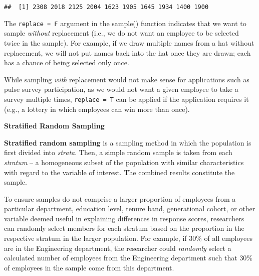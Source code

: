 \documentclass[
]{book}
\newenvironment{Shaded}{\begin{snugshade}}{\end{snugshade}}
\newcommand{\AttributeTok}[1]{\textcolor[rgb]{0.77,0.63,0.00}{#1}}
\newcommand{\CommentTok}[1]{\textcolor[rgb]{0.56,0.35,0.01}{\textit{#1}}}
\newcommand{\DecValTok}[1]{\textcolor[rgb]{0.00,0.00,0.81}{#1}}
\newcommand{\FunctionTok}[1]{\textcolor[rgb]{0.00,0.00,0.00}{#1}}
\newcommand{\NormalTok}[1]{#1}
\newcommand{\OtherTok}[1]{\textcolor[rgb]{0.56,0.35,0.01}{#1}}
\newcommand{\SpecialCharTok}[1]{\textcolor[rgb]{0.00,0.00,0.00}{#1}}
\newcommand{\StringTok}[1]{\textcolor[rgb]{0.31,0.60,0.02}{#1}}
\begin{document}
\begin{Shaded}
\end{Shaded}

\begin{verbatim}
##  [1] 2308 2018 2125 2004 1623 1905 1645 1934 1400 1900
\end{verbatim}

The \texttt{replace\ =\ F} argument in the sample() function indicates that we want to sample \emph{without} replacement (i.e., we do not want an employee to be selected twice in the sample). For example, if we draw multiple names from a hat without replacement, we will not put names back into the hat once they are drawn; each has a chance of being selected only once.

While sampling \emph{with} replacement would not make sense for applications such as pulse survey participation, as we would not want a given employee to take a survey multiple times, \texttt{replace\ =\ T} can be applied if the application requires it (e.g., a lottery in which employees can win more than once).

\textbf{Stratified Random Sampling}

\textbf{Stratified random sampling} is a sampling method in which the population is first divided into \emph{strata}. Then, a simple random sample is taken from each \emph{stratum} -- a homogeneous subset of the population with similar characteristics with regard to the variable of interest. The combined results constitute the sample.

To ensure samples do not comprise a larger proportion of employees from a particular department, education level, tenure band, generational cohort, or other variable deemed useful in explaining differences in response scores, researchers can randomly select members for each stratum based on the proportion in the respective stratum in the larger population. For example, if 30\% of all employees are in the Engineering department, the researcher could \emph{randomly} select a calculated number of employees from the Engineering department such that 30\% of employees in the sample come from this department.
\end{document}
